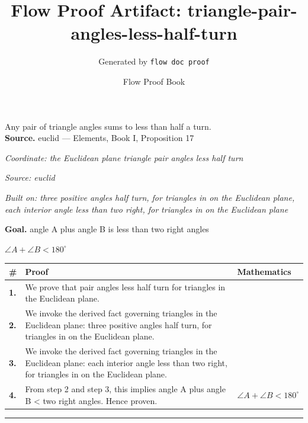 \documentclass[11pt]{article}
\title{Flow Proof Artifact: triangle-pair-angles-less-half-turn}
\author{Generated by \texttt{flow doc proof}}
\date{Flow Proof Book}
\theoremstyle{definition}
\begin{document}
\maketitle
Any pair of triangle angles sums to less than half a turn.\\[0.5em]
\textbf{Source.} euclid — Elements, Book I, Proposition 17\\[0.5em]
\bigskip
{}\par
\smallskip\noindent\textit{Coordinate: the Euclidean plane \cdot triangle \cdot pair angles less half turn}\par
\smallskip\noindent\textit{Source: euclid}\par
\smallskip\noindent\textit{Built on: three positive angles half turn, for triangles in on the Euclidean plane, each interior angle less than two right, for triangles in on the Euclidean plane}\par
\medskip
\noindent\textbf{Goal.} angle A plus angle B is less than two right angles\par
\noindent$\displaystyle \angle A + \angle B < 180^\circ$\par
\medskip
\noindent
\begin{tabular}{@{} >{\raggedright\arraybackslash}p{} >{\raggedright\arraybackslash}p{} >{\raggedleft\arraybackslash}p{} @{}}
\textbf{\#} & \textbf{Proof} & \textbf{Mathematics} \\
\midrule
\textbf{1.} & We prove that pair angles less half turn for triangles in the Euclidean plane. & \\[0.45em]
\textbf{2.} & We invoke the derived fact governing triangles in the Euclidean plane: three positive angles half turn, for triangles in on the Euclidean plane. & \\[0.45em]
\textbf{3.} & We invoke the derived fact governing triangles in the Euclidean plane: each interior angle less than two right, for triangles in on the Euclidean plane. & \\[0.45em]
\textbf{4.} & From step 2 and step 3, this implies angle A plus angle B < two right angles. Hence proven. & $\displaystyle \angle A + \angle B < 180^\circ$ \\[0.45em]
\bottomrule
\end{tabular}
\label{thm:Geometry-triangle-pair_angles_less_half_turn}
\par\medskip\hrule
\end{document}
